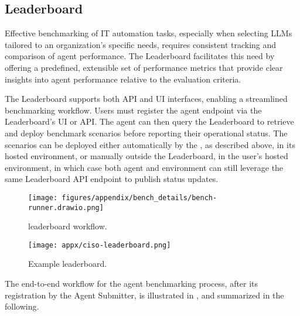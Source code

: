 \subsection{Leaderboard}

Effective benchmarking of IT automation tasks, especially when selecting LLMs tailored to an organization's specific needs, requires consistent tracking and comparison of agent performance. The Leaderboard facilitates this need by offering a predefined, extensible set of performance metrics that provide clear insights into agent performance relative to the evaluation criteria. 

The Leaderboard supports both API and UI interfaces, enabling a streamlined benchmarking workflow. Users must register the agent endpoint via the Leaderboard’s UI or API. The agent can then query the Leaderboard to retrieve and deploy benchmark scenarios before reporting their operational status. The scenarios can be deployed either automatically by the \bench, as described above, in its hosted environment, or manually outside the Leaderboard, in the user's hosted environment, in which case both agent and environment can still leverage the same Leaderboard API endpoint to publish status updates. 



\begin{figure*}[ht]
    \centering
    \texttt{[image: figures/appendix/bench\_details/bench-runner.drawio.png]}
    \caption{\bench leaderboard workflow.}
    \label{fig:IT Agent Bench Leaderboard workflow}
\end{figure*}

\begin{figure*}[ht]
    \centering
    \texttt{[image: appx/ciso-leaderboard.png]}
    \caption{Example \bench leaderboard.}
    \label{fig:ciso-leaderboard}
\end{figure*}

The end-to-end workflow for the agent benchmarking process, after its registration by the Agent Submitter, is illustrated in , and summarized in the following.


